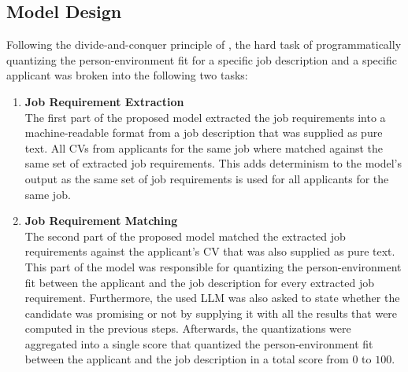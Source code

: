 \documentclass[draft,final]{thesisclass} %
\begin{document}
\subsection{Model Design}
Following the divide-and-conquer principle of \textcite{pj_fit_ml}, the hard task of programmatically quantizing the person-environment fit for a specific job description and a specific applicant was broken into the following two tasks:
\begin{enumerate}
    \item \textbf{Job Requirement Extraction}\\
    The first part of the proposed model extracted the job requirements into a machine-readable format from a job description that was supplied as pure text.
    All \acs{CV}s from applicants for the same job where matched against the same set of extracted job requirements.
    This adds determinism to the model's output as the same set of job requirements is used for all applicants for the same job.
    \item \textbf{Job Requirement Matching}\\
    The second part of the proposed model matched the extracted job requirements against the applicant's \acs{CV} that was also supplied as pure text.
    This part of the model was responsible for quantizing the person-environment fit between the applicant and the job description for every extracted job requirement.
    Furthermore, the used \acs{LLM} was also asked to state whether the candidate was promising or not by supplying it with all the results that were computed in the previous steps.
    Afterwards, the quantizations were aggregated into a single score that quantized the person-environment fit between the applicant and the job description in a total score from $0$ to $100$.
\end{enumerate}
\end{document}
